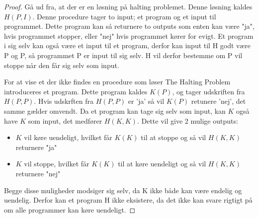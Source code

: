 \begin{proof}
Gå ud fra, at der er en løsning på halting problemet. Denne løsning kaldes $H(P, I)$. Denne procedure tager to input; et program og et input til programmet. Dette program kan så returnere to outputs som enten kan være "ja", hvis programmet stopper, eller "nej" hvis programmet kører for evigt. 
Et program i sig selv kan også være et input til et program, derfor kan input til H godt være P og P, så programmet P er input til sig selv.
H vil derfor bestemme om P vil stoppe når den får sig selv som input.

For at vise et der ikke findes en procedure som løser The Halting Problem introduceres et program. 
Dette program kaldes $K(P)$, og tager udskriften fra $H(P,P)$.
Hvis udskrften fra $H(P,P)$ er 'ja' så vil $K(P)$ retunere 'nej', det samme gælder omvendt.  
Da et program kan tage sig selv som input, kan $K$ også have $K$ som input, det medfører $H(K,K)$. 
Dette vil give 2 mulige outputs:
\begin{itemize}
	\item $K$ vil køre uendeligt, hvilket får $K(K)$ til at stoppe og så vil $H(K,K)$ returnere "ja"
	\item  $K$ vil stoppe, hvilket får $K(K)$ til at køre uendeligt og så vil $H(K,K)$ returnere "nej"
\end{itemize}
Begge disse muligheder modsiger sig selv, da K ikke både kan være endelig og uendelig. Derfor kan et program H ikke eksistere, da det ikke kan svare rigtigt på om alle programmer kan køre uendeligt. 

\end{proof}
